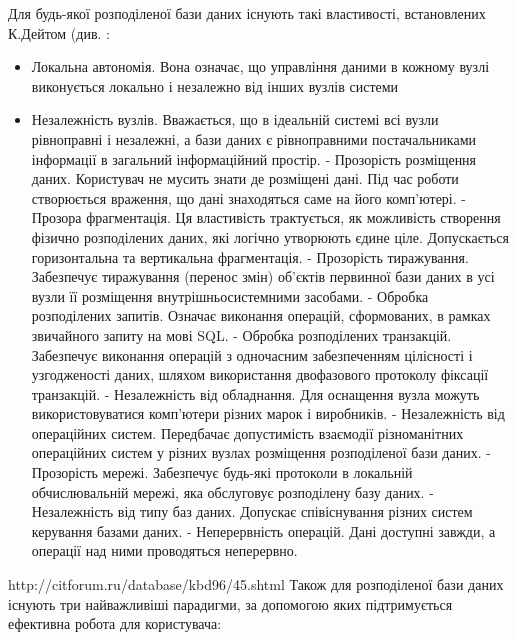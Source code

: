\documentclass[14pt]{vakthesis}
\begin{document}
Для будь-якої розподіленої бази даних існують такі властивості, встановлених К.Дейтом (див. \cite{bib:database_principles} :
\begin{itemize}
 \item Локальна автономія. Вона означає, що управління даними в кожному вузлі виконується локально і незалежно від інших вузлів системи
 \item Незалежність вузлів. Вважається, що в ідеальній системі всі вузли рівноправні і незалежні, а бази даних є рівноправними постачальниками інформації в загальний інформаційний простір.
 - Прозорість розміщення даних. Користувач не мусить знати де розміщені дані. Під час роботи створюється враження, що дані знаходяться саме на його комп’ютері.
 - Прозора фрагментація. Ця властивість трактується, як можливість створення фізично розподілених даних, які логічно утворюють єдине ціле. Допускається горизонтальна та вертикальна фрагментація.
 - Прозорість тиражування. Забезпечує тиражування (перенос змін) об’єктів первинної бази даних в усі вузли її розміщення внутрішньосистемними засобами.
 - Обробка розподілених запитів. Означає виконання операцій, сформованих, в рамках звичайного запиту на мові SQL.
 - Обробка розподілених транзакцій. Забезпечує виконання операцій з одночасним забезпеченням цілісності і узгодженості даних, шляхом використання двофазового протоколу фіксації транзакцій.
 - Незалежність від обладнання. Для оснащення вузла можуть використовуватися комп’ютери різних марок і виробників.
 - Незалежність від операційних систем. Передбачає допустимість взаємодії різноманітних операційних систем у різних вузлах розміщення розподіленої бази даних.
 - Прозорість мережі. Забезпечує будь-які протоколи в локальній обчислювальній мережі, яка обслуговує розподілену базу даних.
 - Незалежність від типу баз даних. Допускає співіснування різних систем керування базами даних.
 - Неперервність операцій. Дані доступні завжди, а операції над ними проводяться неперервно.

\end{itemize} 
http://citforum.ru/database/kbd96/45.shtml
Також для розподіленої бази даних існують три найважливіші парадигми, за допомогою яких підтримується ефективна робота для користувача:
\end{document}
